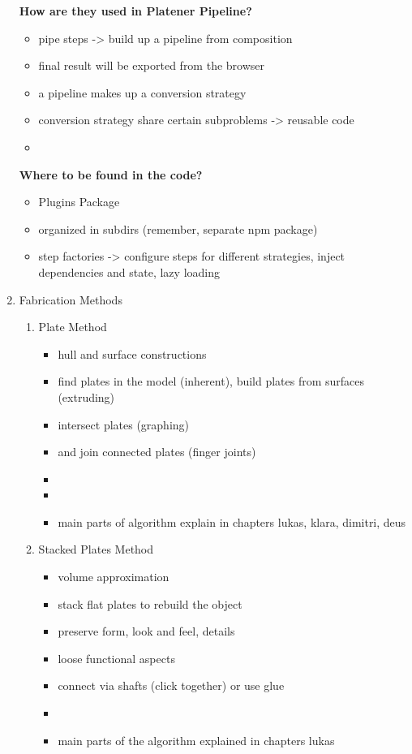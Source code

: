 \documentclass[../ClassicThesis.tex]{subfiles}
\begin{document}
\begin{enumerate}
  \textbf{How are they used in Platener Pipeline?}

  \begin{itemize}
  \item pipe steps -> build up a pipeline from composition
  \item final result will be exported from the browser
  \item a pipeline makes up a conversion strategy
  \item conversion strategy share certain subproblems -> reusable code
  \item {}
  \end{itemize}

  \textbf{Where to be found in the code?}

  \begin{itemize}
  \item Plugins Package
  \item organized in subdirs (remember, separate npm package)
  \item step factories -> configure steps for different strategies, inject
    dependencies and state, lazy loading
  \end{itemize}

\item Fabrication Methods
  \begin{enumerate}
  \item Plate Method
    \begin{itemize}
    \item hull and surface constructions
    \item find plates in the model (inherent), build plates from surfaces
      (extruding)
    \item intersect plates (graphing)
    \item and join connected plates (finger joints)
    \item {}
    \item {}
    \item main parts of algorithm explain in chapters lukas, klara, dimitri, deus
    \end{itemize}

  \item Stacked Plates Method
    \begin{itemize}
    \item volume approximation
    \item stack flat plates to rebuild the object
    \item preserve form, look and feel, details
    \item loose functional aspects
    \item connect via shafts (click together) or use glue
    \item {}
    \item main parts of the algorithm explained in chapters lukas
    \end{itemize}


\end{enumerate}
\end{enumerate}
\end{document}
